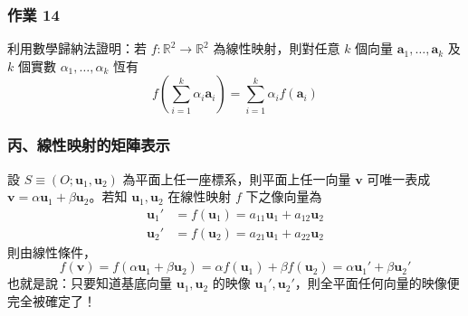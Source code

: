 \subsubsection*{作業 14}
利用數學歸納法證明：若 $f: \mathbb{R}^2 \to \mathbb{R}^2$ 為線性映射，則對任意 $k$ 個向量 $\mathbf{a}_1, \dots, \mathbf{a}_k$ 及 $k$ 個實數 $\alpha_1, \dots, \alpha_k$ 恆有
\[ f\left(\sum_{i=1}^k \alpha_i \mathbf{a}_i\right) = \sum_{i=1}^k \alpha_i f(\mathbf{a}_i) \]

\subsubsection*{丙、線性映射的矩陣表示}

設 $S \equiv (O; \mathbf{u}_1, \mathbf{u}_2)$ 為平面上任一座標系，則平面上任一向量 $\mathbf{v}$ 可唯一表成 $\mathbf{v} = \alpha\mathbf{u}_1 + \beta\mathbf{u}_2$。若知 $\mathbf{u}_1, \mathbf{u}_2$ 在線性映射 $f$ 下之像向量為
\begin{align}
\mathbf{u}_1' &= f(\mathbf{u}_1) = a_{11}\mathbf{u}_1 + a_{12}\mathbf{u}_2 \label{eq:b4s-1-3-7} \\
\mathbf{u}_2' &= f(\mathbf{u}_2) = a_{21}\mathbf{u}_1 + a_{22}\mathbf{u}_2 \nonumber
\end{align}
則由線性條件，
\[ f(\mathbf{v}) = f(\alpha\mathbf{u}_1 + \beta\mathbf{u}_2) = \alpha f(\mathbf{u}_1) + \beta f(\mathbf{u}_2) = \alpha\mathbf{u}_1' + \beta\mathbf{u}_2' \]
也就是說：只要知道基底向量 $\mathbf{u}_1, \mathbf{u}_2$ 的映像 $\mathbf{u}_1', \mathbf{u}_2'$，則全平面任何向量的映像便完全被確定了！

